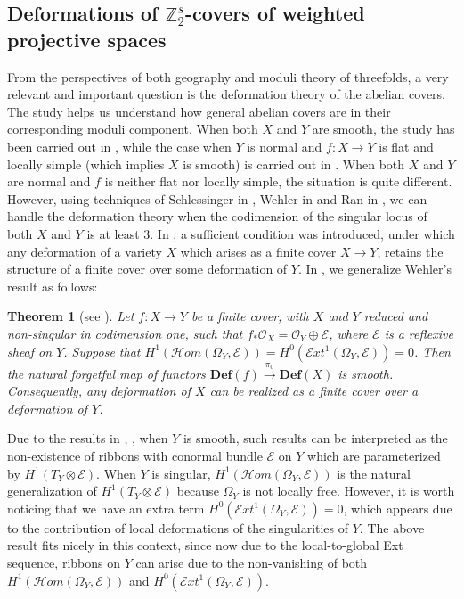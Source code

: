 \documentclass[12pt,twoside,]{amsart}
\theoremstyle{plain}
\newtheorem{theorem}{Theorem}[subsection]
\theoremstyle{definition}
\begin{document}

\subsection{Deformations of $\mathbb{Z}_2^s$-covers of weighted projective spaces }
From the perspectives of both geography and moduli theory of threefolds, a very relevant and important question is the deformation theory of the abelian covers. The study helps us understand how general abelian covers are in their corresponding moduli component. When both $X$ and $Y$ are smooth, the study has been carried out in \cite{pardini1991abelian}, while the case when $Y$ is normal and $f: X \to Y$ is flat and locally simple (which implies $X$ is smooth) is carried out in \cite{Man95}. When both $X$ and $Y$ are normal and $f$ is neither flat nor locally simple, the situation is quite different. However, using techniques of Schlessinger in \cite{schlessinger1971}, Wehler in \cite{wehler86deformations} and Ran in \cite{defofmaps89}, we can handle the deformation theory when the codimension of the singular locus of both $X$ and $Y$ is at least $3$. In \cite{wehler86deformations}, a sufficient condition was introduced, under which any deformation of a variety $X$ which arises as a finite cover $X \to Y$, retains the structure of a finite cover over some deformation of $Y$. In , we generalize Wehler's result as follows:


\begin{theorem}[see ]
  Let $f: X \to Y$ be a finite cover, with $X$ and $Y$ reduced and non-singular in codimension one, such that $f_*\mathcal{O}_X = \mathcal{O}_Y \oplus \mathcal{E}$, where $\mathcal{E}$ is a reflexive sheaf on $Y$. Suppose that $H^1(\mathcal{H}om(\Omega_Y, \mathcal{E})) = H^0(\mathcal{E}xt^1(\Omega_Y, \mathcal{E})) = 0$. Then the natural forgetful map of functors $\mathbf{Def}(f) \xrightarrow{\pi_0} \mathbf{Def}(X)$ is smooth. Consequently, any deformation of $X$ can be realized as a finite cover over a deformation of $Y$. 
\end{theorem}

Due to the results in \cite{Gon06}, \cite{GGP16}, when $Y$ is smooth, such results can be interpreted as the non-existence of ribbons with conormal bundle $\mathcal{E}$ on $Y$ which are parameterized by $H^1(T_Y \otimes \mathcal{E})$. When $Y$ is singular, $H^1(\mathcal{H}om(\Omega_Y, \mathcal{E}))$ is the natural generalization of $H^1(T_Y \otimes \mathcal{E})$ because $\Omega_Y$ is not locally free. However, it is worth noticing that we have an extra term $H^0(\mathcal{E}xt^1(\Omega_Y, \mathcal{E})) = 0$, which appears due to the contribution of local deformations of the singularities of $Y$. The above result fits nicely in this context, since now due to the local-to-global Ext sequence, ribbons on $Y$ can arise due to the non-vanishing of both $H^1(\mathcal{H}om(\Omega_Y, \mathcal{E}))$ and $H^0(\mathcal{E}xt^1(\Omega_Y, \mathcal{E}))$.  \par
\end{document}
